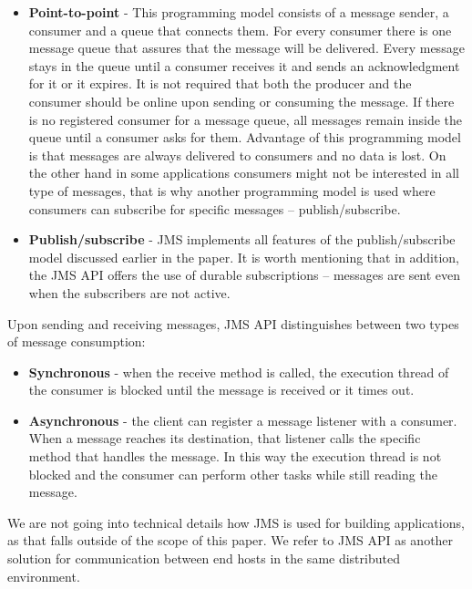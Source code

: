 \documentclass{sigplanconf}
\begin{document}
\begin{itemize} \itemsep1pt \parskip0pt 
\item \textbf{Point-to-point} - This programming model consists of a message sender, a consumer and a queue that connects them. For every consumer there is one message queue that assures that the message will be delivered. Every message stays in the queue until a consumer receives it and sends an acknowledgment for it or it expires. It is not required that both the producer and the consumer should be online upon sending or consuming the message. If there is no registered consumer for a message queue, all messages remain inside the queue until a consumer asks for them. Advantage of this programming model is that messages are always delivered to consumers and no data is lost. On the other hand in some applications consumers might not be interested in all type of messages, that is why another programming model is used where consumers can subscribe for specific messages -- publish/subscribe.
\item \textbf{Publish/subscribe} - JMS implements all features of the publish/subscribe model discussed earlier in the paper. It is worth mentioning that in addition, the JMS API offers the use of durable subscriptions – messages are sent even when the subscribers are not active.

\end{itemize}


Upon sending and receiving messages, JMS API distinguishes between two types of message consumption:
\begin{itemize} \itemsep1pt \parskip0pt 
\item \textbf{Synchronous} - when the receive method is called, the execution thread of the consumer is blocked until the message is received or it times out.
\item \textbf{Asynchronous} - the client can register a message listener with a consumer. When a message reaches its destination, that listener calls the specific method that handles the message. In this way the execution thread is not blocked and the consumer can perform other tasks while still reading the message.

\end{itemize}

We are not going into technical details how JMS is used for building applications, as that falls outside of the scope of this paper. We refer to JMS API as another solution for communication between end hosts in the same distributed environment.
\end{document}
